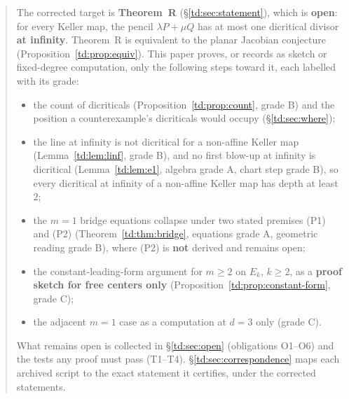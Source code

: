 \documentclass[a4paper,11pt]{article}
\theoremstyle{plain}
\theoremstyle{definition}
\theoremstyle{remark}
\begin{document}
\begin{abstract}
The corrected target is \textbf{Theorem~R} (\S\ref{td:sec:statement}), which is \textbf{open}:
for every Keller map, the pencil $\lambda P + \mu Q$ has at most one dicritical divisor
\textbf{at infinity}. Theorem~R is equivalent to the planar Jacobian conjecture
(Proposition~\ref{td:prop:equiv}). This paper proves, or records as sketch or fixed-degree
computation, only the following steps toward it, each labelled with its grade:
\begin{itemize}[nosep]
\item the count of dicriticals (Proposition~\ref{td:prop:count}, grade B) and the position a
counterexample's dicriticals would occupy (\S\ref{td:sec:where});
\item the line at infinity is not dicritical for a non-affine Keller map
(Lemma~\ref{td:lem:linf}, grade B), and no first blow-up at infinity is dicritical
(Lemma~\ref{td:lem:e1}, algebra grade A, chart step grade B), so every dicritical at infinity
of a non-affine Keller map has depth at least $2$;
\item the $m = 1$ bridge equations collapse under two stated premises (P1) and (P2)
(Theorem~\ref{td:thm:bridge}, equations grade A, geometric reading grade B), where (P2) is
\textbf{not} derived and remains open;
\item the constant-leading-form argument for $m \geq 2$ on $E_k$, $k \geq 2$, as a
\textbf{proof sketch for free centers only} (Proposition~\ref{td:prop:constant-form}, grade C);
\item the adjacent $m = 1$ case as a computation at $d = 3$ only (grade C).
\end{itemize}
What remains open is collected in \S\ref{td:sec:open} (obligations O1--O6) and the tests any
proof must pass (T1--T4). \S\ref{td:sec:correspondence} maps each archived script to the exact
statement it certifies, under the corrected statements.
\end{abstract}
\end{document}
